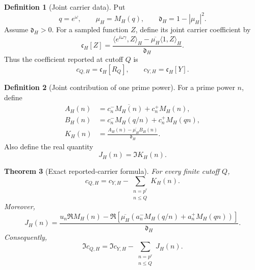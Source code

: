 \documentclass[11pt]{amsart}
\numberwithin{equation}{section}
\theoremstyle{plain}
\newtheorem{theorem}{Theorem}[section]
\theoremstyle{definition}
\newtheorem{definition}[theorem]{Definition}
\theoremstyle{remark}
\newcommand{\1}{\mathbf{1}}
\begin{document}
\begin{definition}[Joint carrier data]
\label{def:joint_carrier_data}
Put
\begin{equation}
q=e^\omega,
\qquad
\mu_H=M_H(q),
\qquad
\mathfrak d_H=1-|\mu_H|^2.
\label{eq:joint_carrier_data}
\end{equation}
Assume \(\mathfrak d_H>0\).  For a sampled function \(Z\), define its joint
carrier coefficient by
\begin{equation}
\mathfrak c_H[Z]
=
\frac{
\langle e^{i\omega\gamma},Z\rangle_H
-
\overline{\mu_H}\langle1,Z\rangle_H
}{
\mathfrak d_H
}.
\label{eq:joint_carrier_functional}
\end{equation}
Thus the coefficient reported at cutoff \(Q\) is
\begin{equation}
c_{Q,H}=\mathfrak c_H[R_Q],
\qquad
c_{Y,H}=\mathfrak c_H[Y].
\label{eq:joint_carrier_reported_definition}
\end{equation}
\end{definition}

\begin{definition}[Joint contribution of one prime power]
\label{def:joint_prime_increment}
For a prime power \(n\), define
\begin{align}
A_H(n)
&=
c_n^-\overline{M_H(n)}+c_n^+M_H(n),
\label{eq:joint_AH_definition}
\\
B_H(n)
&=
c_n^-M_H(q/n)+c_n^+M_H(qn),
\label{eq:joint_BH_definition}
\\
K_H(n)
&=
\frac{A_H(n)-\overline{\mu_H}B_H(n)}
{\mathfrak d_H}.
\label{eq:joint_KH_definition}
\end{align}
Also define the real quantity
\begin{equation}
J_H(n)
=
\Im K_H(n).
\label{eq:joint_JH_definition}
\end{equation}
\end{definition}

\begin{theorem}[Exact reported-carrier formula]
\label{thm:exact_joint_carrier_formula}
For every finite cutoff \(Q\),
\begin{equation}
\boxed{
c_{Q,H}
=
c_{Y,H}
-
\sum_{\substack{n=p^r\\n\leq Q}}K_H(n).
}
\label{eq:exact_joint_carrier_formula}
\end{equation}
Moreover,
\begin{equation}
\boxed{
J_H(n)
=
\frac{
u_n\Re M_H(n)
-
\Re\!\left[
\overline{\mu_H}
\left(
a_n^-M_H(q/n)+a_n^+M_H(qn)
\right)
\right]
}{
\mathfrak d_H
}.
}
\label{eq:joint_JH_explicit}
\end{equation}
Consequently,
\begin{equation}
\boxed{
\Im c_{Q,H}
=
\Im c_{Y,H}
-
\sum_{\substack{n=p^r\\n\leq Q}}J_H(n).
}
\label{eq:exact_joint_imaginary_formula}
\end{equation}
\end{theorem}
\end{document}
